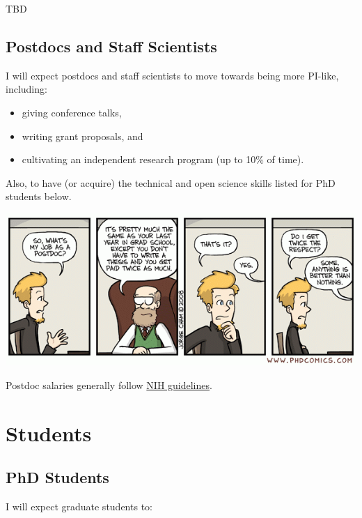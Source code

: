 \documentclass[]{book}
\providecommand{\tightlist}{%
  \setlength{\itemsep}{0pt}\setlength{\parskip}{0pt}}
\begin{document}
TBD

\hypertarget{postdocs-and-staff-scientists}{%
\subsection{Postdocs and Staff Scientists}\label{postdocs-and-staff-scientists}}

I will expect postdocs and staff scientists to move towards being more PI-like, including:

\begin{itemize}
\tightlist
\item
  giving conference talks,\\
\item
  writing grant proposals, and\\
\item
  cultivating an independent research program (up to 10\% of time).
\end{itemize}

Also, to have (or acquire) the technical and open science skills listed for PhD students below.

\includegraphics{images/postdoc.gif}

Postdoc salaries generally follow \href{https://www.niaid.nih.gov/grants-contracts/salary-cap-and-stipend-levels-announced}{NIH guidelines}.

\hypertarget{students}{%
\section{Students}\label{students}}

\hypertarget{phd-students}{%
\subsection{PhD Students}\label{phd-students}}

I will expect graduate students to:
\end{document}
